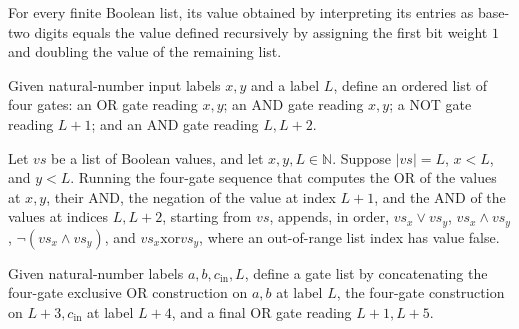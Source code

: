 \begin{theorem}
\label{BoolCircuit.bitsVal_eq_logProg_bitsVal}
\leanok
{}
For every finite Boolean list, its value obtained by interpreting its entries as
base-two digits equals the value defined recursively by assigning the first bit weight
$1$ and doubling the value of the remaining list.
\end{theorem}

\begin{definition}
\label{BoolCircuit.xorGates}
\leanok
{}
Given natural-number input labels $x,y$ and a label $L$, define an ordered list of four
gates: an OR gate reading $x,y$; an AND gate reading $x,y$; a NOT gate reading $L+1$;
and an AND gate reading $L,L+2$.
\end{definition}

\begin{theorem}
\label{BoolCircuit.runWith_xorGates}
\leanok
{}
Let $vs$ be a list of Boolean values, and let $x,y,L\in\mathbb{N}$. Suppose $|vs|=L$,
$x<L$, and $y<L$. Running the four-gate sequence that computes the OR of the values at
$x,y$, their AND, the negation of the value at index $L+1$, and the AND of the values at
indices $L,L+2$, starting from $vs$, appends, in order, $vs_x\lor vs_y$, $vs_x\land
vs_y$, $\neg(vs_x\land vs_y)$, and $vs_x\mathbin{\mathrm{xor}}vs_y$, where an
out-of-range list index has value false.
\end{theorem}

\begin{definition}
\label{BoolCircuit.fullAdderGates}
\leanok
{}
Given natural-number labels $a,b,c_{\mathrm{in}},L$, define a gate list by concatenating
the four-gate exclusive OR construction on $a,b$ at label $L$, the four-gate
construction on $L+3,c_{\mathrm{in}}$ at label $L+4$, and a final OR gate reading
$L+1,L+5$.
\end{definition}

